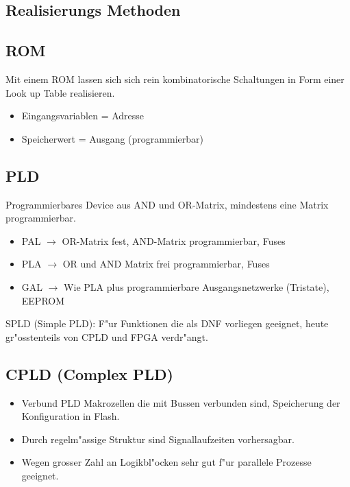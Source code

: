 \begin{scriptsize}

\section{Realisierungs Methoden}
\subsection{ROM}
Mit einem ROM lassen sich sich rein kombinatorische Schaltungen in Form einer Look up Table realisieren.
\begin{itemize}
	\setlength{\itemsep}{1pt}
  \setlength{\parskip}{0pt}
  \setlength{\parsep}{0pt}
  
	\item Eingangsvariablen = Adresse
	\item Speicherwert = Ausgang (programmierbar)
\end{itemize}



\subsection{PLD}
Programmierbares Device aus AND und OR-Matrix, mindestens eine Matrix programmierbar.
\begin{itemize}
	\setlength{\itemsep}{1pt}
  \setlength{\parskip}{0pt}
  \setlength{\parsep}{0pt}
  
	\item PAL $\rightarrow$ OR-Matrix fest, AND-Matrix programmierbar, Fuses
	\item PLA $\rightarrow$ OR und AND Matrix frei programmierbar, Fuses
	\item GAL $\rightarrow$ Wie PLA plus programmierbare Ausgangsnetzwerke (Tristate), EEPROM
\end{itemize}
SPLD (Simple PLD): F"ur Funktionen die als DNF vorliegen geeignet, heute gr"osstenteils von CPLD und FPGA verdr"angt.

\subsection{CPLD (Complex PLD)}
\begin{itemize}
	\setlength{\itemsep}{1pt}
  \setlength{\parskip}{0pt}
  \setlength{\parsep}{0pt}
  
	\item Verbund PLD Makrozellen die mit Bussen verbunden sind, Speicherung der Konfiguration in Flash.
	\item	Durch regelm"assige Struktur sind Signallaufzeiten vorhersagbar.
	\item Wegen grosser Zahl an Logikbl"ocken sehr gut f"ur parallele Prozesse geeignet.
\end{itemize}


\end{scriptsize}
